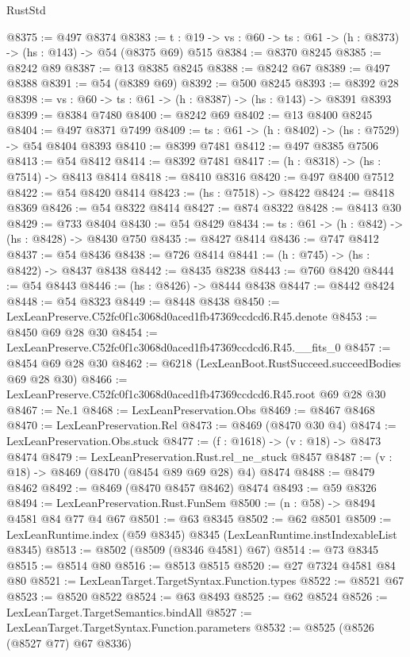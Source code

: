 \begin{lexlean}{RustStd}
\begin{coremodule}
@8375 := @497 @8374
@8383 := {t : @19} -> {vs : @60} -> {ts : @61} -> (h : @8373) -> (hs : @143) -> @54 (@8375 @69) @515
@8384 := @8370 @8245
@8385 := @8242 @89
@8387 := @13 @8385 @8245
@8388 := @8242 @67
@8389 := @497 @8388
@8391 := @54 (@8389 @69)
@8392 := @500 @8245
@8393 := @8392 @28
@8398 := {vs : @60} -> {ts : @61} -> (h : @8387) -> (hs : @143) -> @8391 @8393
@8399 := @8384 @7480
@8400 := @8242 @69
@8402 := @13 @8400 @8245
@8404 := @497 @8371 @7499
@8409 := {ts : @61} -> (h : @8402) -> (hs : @7529) -> @54 @8404 @8393
@8410 := @8399 @7481
@8412 := @497 @8385 @7506
@8413 := @54 @8412
@8414 := @8392 @7481
@8417 := (h : @8318) -> (hs : @7514) -> @8413 @8414
@8418 := @8410 @8316
@8420 := @497 @8400 @7512
@8422 := @54 @8420 @8414
@8423 := (hs : @7518) -> @8422
@8424 := @8418 @8369
@8426 := @54 @8322 @8414
@8427 := @874 @8322
@8428 := @8413 @30
@8429 := @733 @8404
@8430 := @54 @8429
@8434 := {ts : @61} -> (h : @842) -> (hs : @8428) -> @8430 @750
@8435 := @8427 @8414
@8436 := @747 @8412
@8437 := @54 @8436
@8438 := @726 @8414
@8441 := (h : @745) -> (hs : @8422) -> @8437 @8438
@8442 := @8435 @8238
@8443 := @760 @8420
@8444 := @54 @8443
@8446 := (hs : @8426) -> @8444 @8438
@8447 := @8442 @8424
@8448 := @54 @8323
@8449 := @8448 @8438
@8450 := LexLeanPreserve.C52fc0f1c3068d0aced1fb47369ccdcd6.R45.denote
@8453 := @8450 @69 @28 @30
@8454 := LexLeanPreserve.C52fc0f1c3068d0aced1fb47369ccdcd6.R45.__fits_0
@8457 := @8454 @69 @28 @30
@8462 := @6218 (LexLeanBoot.RustSucceed.succeedBodies @69 @28 @30)
@8466 := LexLeanPreserve.C52fc0f1c3068d0aced1fb47369ccdcd6.R45.root @69 @28 @30
@8467 := Ne.{1}
@8468 := LexLeanPreservation.Obs
@8469 := @8467 @8468
@8470 := LexLeanPreservation.Rel
@8473 := @8469 (@8470 @30 @4)
@8474 := LexLeanPreservation.Obs.stuck
@8477 := (f : @1618) -> (v : @18) -> @8473 @8474
@8479 := LexLeanPreservation.Rust.rel_ne_stuck @8457
@8487 := (v : @18) -> @8469 (@8470 (@8454 @89 @69 @28) @4) @8474
@8488 := @8479 @8462
@8492 := @8469 (@8470 @8457 @8462) @8474
@8493 := @59 @8326
@8494 := LexLeanPreservation.Rust.FunSem
@8500 := (n : @58) -> @8494 @4581 @84 @77 @4 @67
@8501 := @63 @8345
@8502 := @62 @8501
@8509 := LexLeanRuntime.index (@59 @8345) @8345 (LexLeanRuntime.instIndexableList @8345)
@8513 := @8502 (@8509 (@8346 @4581) @67)
@8514 := @73 @8345
@8515 := @8514 @80
@8516 := @8513 @8515
@8520 := @27 @7324 @4581 @84 @80
@8521 := LexLeanTarget.TargetSyntax.Function.types
@8522 := @8521 @67
@8523 := @8520 @8522
@8524 := @63 @8493
@8525 := @62 @8524
@8526 := LexLeanTarget.TargetSemantics.bindAll
@8527 := LexLeanTarget.TargetSyntax.Function.parameters
@8532 := @8525 (@8526 (@8527 @77) @67 @8336)

\end{coremodule}
\end{lexlean}
